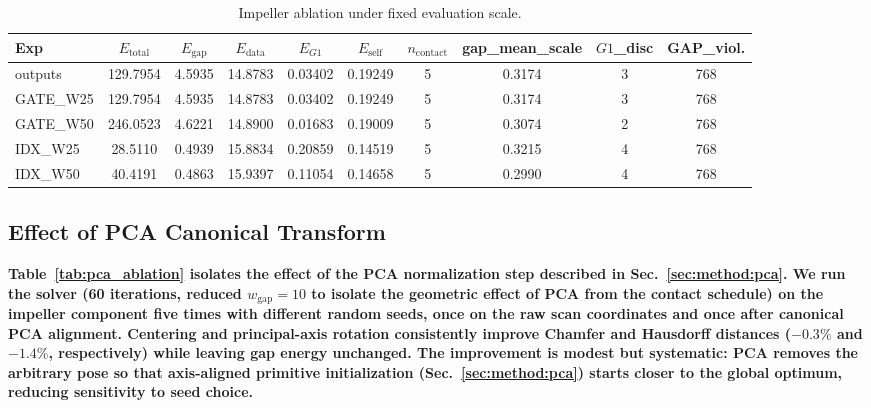 \documentclass{ieeeaccess}
\providecommand{\DIFaddtex}[1]{{\color{blue}\bfseries #1}} %
\providecommand{\DIFaddbegin}{} %
\providecommand{\DIFadd}[1]{\texorpdfstring{\DIFaddtex{#1}}{#1}} %
\begin{document}
\begin{table}[t]
  \caption{Impeller ablation under fixed evaluation scale.}
  \label{tab:impeller_ablation}
  \centering
  \setlength{\tabcolsep}{9pt}
  \scriptsize
  \begin{tabular}{
      l
      S[table-format=3.4]
      S[table-format=1.4]
      S[table-format=2.4]
      S[table-format=1.5]
      S[table-format=1.5]
      S[table-format=1.0]
      S[table-format=1.4]
      S[table-format=1.0]
      S[table-format=3.0]
    }
    \toprule
    \textbf{Exp} & {\textbf{$E_{\text{total}}$}}
                 & {\textbf{$E_{\text{gap}}$}}
                 & {\textbf{$E_{\text{data}}$}}
                 & {\textbf{$E_{G1}$}}
                 & {\textbf{$E_{\text{self}}$}}
                 & {\textbf{$n_{\text{contact}}$}}
                 & {\textbf{gap\_mean\_scale}}
                 & {$G1$\textbf{\_disc}}
                 & {\textbf{GAP\_viol.}} \\
    \midrule
    outputs   & 129.7954 & 4.5935 & 14.8783 & 0.03402 & 0.19249 & 5 & 0.3174 & 3 & 768 \\
    GATE\_W25 & 129.7954 & 4.5935 & 14.8783 & 0.03402 & 0.19249 & 5 & 0.3174 & 3 & 768 \\
    GATE\_W50 & 246.0523 & 4.6221 & 14.8900 & 0.01683 & 0.19009 & 5 & 0.3074 & 2 & 768 \\
    IDX\_W25  &  28.5110 & 0.4939 & 15.8834 & 0.20859 & 0.14519 & 5 & 0.3215 & 4 & 768 \\
    IDX\_W50  &  40.4191 & 0.4863 & 15.9397 & 0.11054 & 0.14658 & 5 & 0.2990 & 4 & 768 \\
    \bottomrule
  \end{tabular}
\end{table}

\DIFaddbegin \subsection{\DIFadd{Effect of PCA Canonical Transform}}
\label{sec:pca_ablation}
\DIFadd{Table~\ref{tab:pca_ablation} isolates the effect of the PCA normalization
step described in Sec.~\ref{sec:method:pca}.
We run the solver (60 iterations, reduced $w_{\text{gap}}{=}10$ to
isolate the geometric effect of PCA from the contact schedule)
on the impeller component five times with different random seeds,
once on the raw scan coordinates and once after canonical PCA alignment.
Centering and principal-axis rotation consistently improve Chamfer and
Hausdorff distances ($-0.3\%$ and $-1.4\%$, respectively) while leaving
gap energy unchanged.
The improvement is modest but systematic: PCA removes the arbitrary
pose so that axis-aligned primitive initialization (Sec.~\ref{sec:method:pca})
starts closer to the global optimum, reducing sensitivity to seed choice.
}
\end{document}
